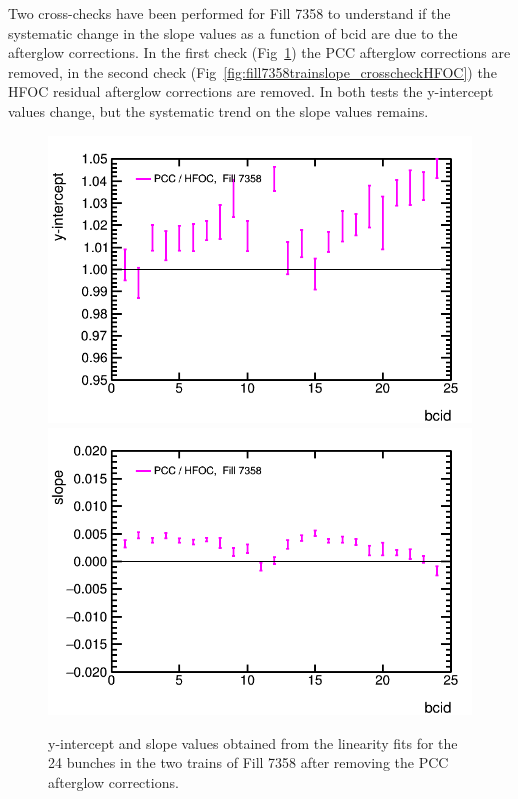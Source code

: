 
Two cross-checks have been performed for Fill 7358 to understand if the systematic change in the slope values as a function of bcid are due to the afterglow corrections.
In the first check (Fig~\ref{fig:fill7358trainslope_crosscheckPCC}) the PCC afterglow corrections are removed, in the second check (Fig~\ref{fig:fill7358trainslope_crosscheckHFOC}) the HFOC residual afterglow corrections are removed.
In both tests the y-intercept values change, but the systematic trend on the slope values remains.

\vspace{36pt}
\begin{figure}[hc]
  \begin{center}
    \includegraphics[width=0.47\linewidth]{plots/sbilratios_trains_Fill7358/plot_det_linearity_perbx_y0_7358_NoPCCCorr.png}
    \includegraphics[width=0.47\linewidth]{plots/sbilratios_trains_Fill7358/plot_det_linearity_perbx_slope_7358_NoPCCCorr.png}
    \caption{
      y-intercept and slope values obtained from the linearity fits for the 24 bunches in the two trains of Fill 7358 after removing the PCC afterglow corrections.
      \label{fig:fill7358trainslope_crosscheckPCC}
    }


\end{center}
\end{figure}
